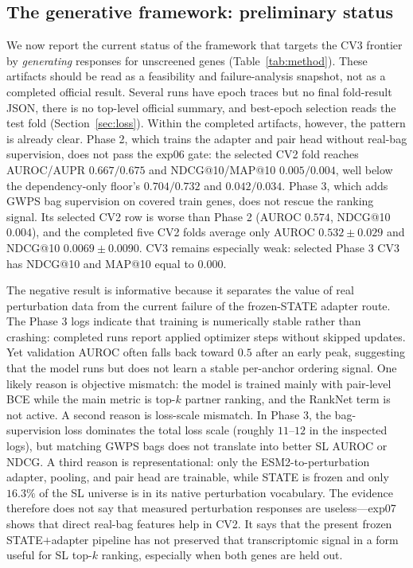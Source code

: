 \subsection{The generative framework: preliminary status}
\label{sec:exp-method}

We now report the current status of the framework that targets the CV3 frontier
by \emph{generating} responses for unscreened genes (Table~\ref{tab:method}).
These artifacts should be read as a feasibility and failure-analysis snapshot,
not as a completed official result. Several runs have epoch traces but no final
fold-result JSON, there is no top-level official summary, and best-epoch
selection reads the test fold (Section~\ref{sec:loss}). Within the completed
artifacts, however, the pattern is already clear. Phase 2, which trains the
adapter and pair head without real-bag supervision, does not pass the exp06 gate:
the selected CV2 fold reaches AUROC/AUPR $0.667/0.675$ and NDCG@10/MAP@10
$0.005/0.004$, well below the dependency-only floor's $0.704/0.732$ and
$0.042/0.034$. Phase 3, which adds GWPS bag supervision on covered train genes,
does not rescue the ranking signal. Its selected CV2 row is worse than Phase 2
(AUROC $0.574$, NDCG@10 $0.004$), and the completed five CV2 folds average only
AUROC $0.532\pm0.029$ and NDCG@10 $0.0069\pm0.0090$. CV3 remains especially
weak: selected Phase 3 CV3 has NDCG@10 and MAP@10 equal to $0.000$.

The negative result is informative because it separates the value of real
perturbation data from the current failure of the frozen-STATE adapter route.
The Phase 3 logs indicate that training is numerically stable rather than
crashing: completed runs report applied optimizer steps without skipped updates.
Yet validation AUROC often falls back toward $0.5$ after an early peak, suggesting
that the model runs but does not learn a stable per-anchor ordering signal. One
likely reason is objective mismatch: the model is trained mainly with pair-level
BCE while the main metric is top-$k$ partner ranking, and the RankNet term is not
active. A second reason is loss-scale mismatch. In Phase 3, the bag-supervision
loss dominates the total loss scale (roughly $11$--$12$ in the inspected logs),
but matching GWPS bags does not translate into better SL AUROC or NDCG. A third
reason is representational: only the ESM2-to-perturbation adapter, pooling, and
pair head are trainable, while STATE is frozen and only $16.3\%$ of the SL
universe is in its native perturbation vocabulary. The evidence therefore does
not say that measured perturbation responses are useless---exp07 shows that
direct real-bag features help in CV2. It says that the present frozen
STATE${+}$adapter pipeline has not preserved that transcriptomic signal in a form
useful for SL top-$k$ ranking, especially when both genes are held out.

